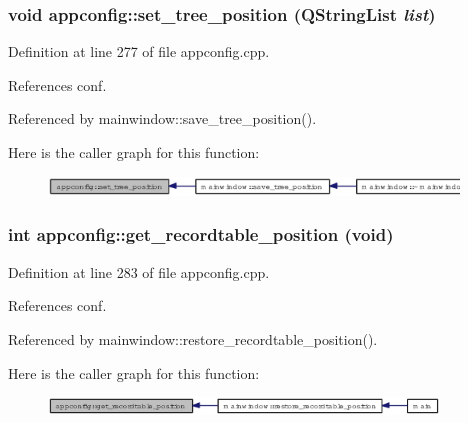 \subsubsection{\setlength{\rightskip}{0pt plus 5cm}void appconfig::set\_\-tree\_\-position (QString\-List {\em list})}\label{classappconfig_2861dee157700f295a4cf93236c8fba0}




Definition at line 277 of file appconfig.cpp.

References conf.

Referenced by mainwindow::save\_\-tree\_\-position().

Here is the caller graph for this function:\begin{figure}[H]
\begin{center}
\leavevmode
\includegraphics[width=309pt]{classappconfig_2861dee157700f295a4cf93236c8fba0_icgraph}
\end{center}
\end{figure}
\subsubsection{\setlength{\rightskip}{0pt plus 5cm}int appconfig::get\_\-recordtable\_\-position (void)}\label{classappconfig_28d3a670a10c4d0ef00f39a17db41bd3}




Definition at line 283 of file appconfig.cpp.

References conf.

Referenced by mainwindow::restore\_\-recordtable\_\-position().

Here is the caller graph for this function:\begin{figure}[H]
\begin{center}
\leavevmode
\includegraphics[width=294pt]{classappconfig_28d3a670a10c4d0ef00f39a17db41bd3_icgraph}
\end{center}
\end{figure}
